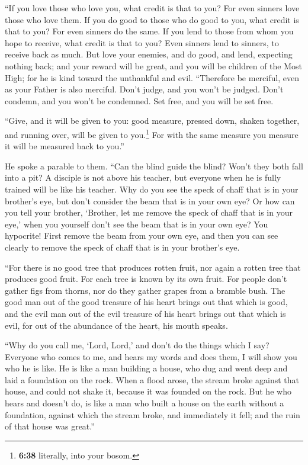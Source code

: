  ``If you love those who love you, what credit is that to
you? For even sinners love those who love them.  If you
do good to those who do good to you, what credit is that to you? For
even sinners do the same.  If you lend to those from whom
you hope to receive, what credit is that to you? Even sinners lend to
sinners, to receive back as much.  But love your enemies,
and do good, and lend, expecting nothing back; and your reward will be
great, and you will be children of the Most High; for he is kind toward
the unthankful and evil.  ``Therefore be merciful, even
as your Father is also merciful.  Don't judge, and you
won't be judged. Don't condemn, and you won't be condemned. Set free,
and you will be set free.

 ``Give, and it will be given to you: good measure,
pressed down, shaken together, and running over, will be given to
you.\footnote{\textbf{6:38} literally, into your bosom.} For with the
same measure you measure it will be measured back to you.''

 He spoke a parable to them. ``Can the blind guide the
blind? Won't they both fall into a pit?  A disciple is
not above his teacher, but everyone when he is fully trained will be
like his teacher.  Why do you see the speck of chaff that
is in your brother's eye, but don't consider the beam that is in your
own eye?  Or how can you tell your brother, `Brother, let
me remove the speck of chaff that is in your eye,' when you yourself
don't see the beam that is in your own eye? You hypocrite! First remove
the beam from your own eye, and then you can see clearly to remove the
speck of chaff that is in your brother's eye.

 ``For there is no good tree that produces rotten fruit,
nor again a rotten tree that produces good fruit.  For
each tree is known by its own fruit. For people don't gather figs from
thorns, nor do they gather grapes from a bramble bush. 
The good man out of the good treasure of his heart brings out that which
is good, and the evil man out of the evil treasure of his heart brings
out that which is evil, for out of the abundance of the heart, his mouth
speaks.

 ``Why do you call me, `Lord, Lord,' and don't do the
things which I say?  Everyone who comes to me, and hears
my words and does them, I will show you who he is like. 
He is like a man building a house, who dug and went deep and laid a
foundation on the rock. When a flood arose, the stream broke against
that house, and could not shake it, because it was founded on the rock.
 But he who hears and doesn't do, is like a man who built
a house on the earth without a foundation, against which the stream
broke, and immediately it fell; and the ruin of that house was great.''

